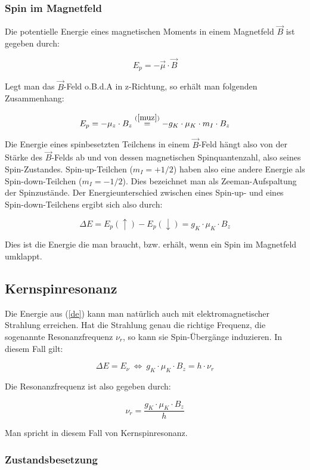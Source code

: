 \subsubsection{Spin im Magnetfeld}

Die potentielle Energie eines magnetischen Moments in einem Magnetfeld $\vec B$ ist gegeben durch:

$$ E_p = -\vec\mu\cdot\vec B $$

Legt man das $\vec B$-Feld o.B.d.A in z-Richtung, so erhält man folgenden Zusammenhang:

$$ E_p = -\mu_z\cdot B_z \stackrel{(\ref{muz})}{=} -g_K \cdot \mu_K \cdot m_I\cdot B_z $$

Die Energie eines spinbesetzten Teilchens in einem $\vec B$-Feld hängt also von der Stärke des $\vec B$-Felds ab und von dessen magnetischen Spinquantenzahl, also seines Spin-Zustandes. Spin-up-Teilchen ($m_I = +1/2$) haben also eine andere Energie als Spin-down-Teilchen ($m_I = -1/2$). Dies bezeichnet man als Zeeman-Aufspaltung der Spinzustände. Der Energieunterschied zwischen eines Spin-up- und eines Spin-down-Teilchens ergibt sich also durch:

\begin{equation} \Delta E = E_p(\uparrow) - E_p(\downarrow) =  g_K \cdot \mu_K \cdot B_z \label{de} \end{equation}

Dies ist die Energie die man braucht, bzw. erhält, wenn ein Spin im Magnetfeld umklappt.

\subsection{Kernspinresonanz}

Die Energie aus (\ref{de}) kann man natürlich auch mit elektromagnetischer Strahlung erreichen. Hat die Strahlung genau die richtige Frequenz, die sogenannte Resonanzfrequenz $\nu_r$, so kann sie Spin-Übergänge induzieren. In diesem Fall gilt:

$$ \Delta E = E_\nu \ \Leftrightarrow \ g_K \cdot \mu_K \cdot B_z = h\cdot \nu_r $$

Die Resonanzfrequenz ist also gegeben durch:

\begin{equation} \nu_r = \frac{g_K \cdot \mu_K \cdot B_z}{h} \label{g} \end{equation}

Man spricht in diesem Fall von Kernspinresonanz. 

\subsubsection{Zustandsbesetzung}

